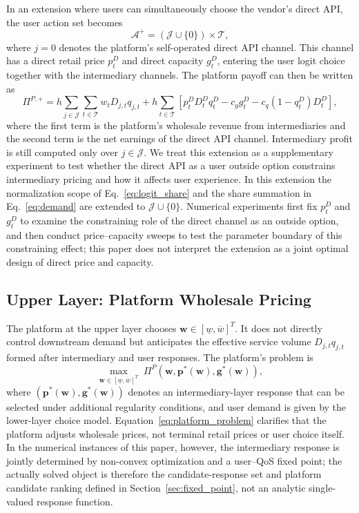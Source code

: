 \documentclass[11pt,a4paper]{article}
\newcommand{\T}{\mathcal{T}}
\newcommand{\J}{\mathcal{J}}
\newcommand{\A}{\mathcal{A}}
\newcommand{\D}{D}
\newcommand{\w}{\boldsymbol{w}}
\newcommand{\p}{\boldsymbol{p}}
\newcommand{\g}{\boldsymbol{g}}
\begin{document}
In an extension where users can simultaneously choose the vendor's direct API, the user action set becomes
\begin{equation}
  \A^+=(\J\cup\{0\})\times\T,
  \label{eq:direct_api_action_set}
\end{equation}
where $j=0$ denotes the platform's self-operated direct API channel. This channel has a direct retail price $p^D_t$ and direct capacity $g^D_t$, entering the user logit choice together with the intermediary channels. The platform payoff can then be written as
\begin{equation}
  \Pi^{P,+}
  =h\sum_{j\in\J}\sum_{t\in\T}w_t\D_{j,t}q_{j,t}
  +h\sum_{t\in\T}\left[
    p^D_t\D^D_tq^D_t-c_g g^D_t-c_q(1-q^D_t)\D^D_t
  \right],
  \label{eq:direct_platform_payoff}
\end{equation}
where the first term is the platform's wholesale revenue from intermediaries and the second term is the net earnings of the direct API channel. Intermediary profit is still computed only over $j\in\J$. We treat this extension as a supplementary experiment to test whether the direct API as a user outside option constrains intermediary pricing and how it affects user experience. In this extension the normalization scope of Eq.~\eqref{eq:logit_share} and the share summation in Eq.~\eqref{eq:demand} are extended to $\J\cup\{0\}$. Numerical experiments first fix $p^D_t$ and $g^D_t$ to examine the constraining role of the direct channel as an outside option, and then conduct price--capacity sweeps to test the parameter boundary of this constraining effect; this paper does not interpret the extension as a joint optimal design of direct price and capacity.

\subsection{Upper Layer: Platform Wholesale Pricing}
\label{sec:upper_platform}

The platform at the upper layer chooses $\w\in[\underline w,\overline w]^T$. It does not directly control downstream demand but anticipates the effective service volume $\D_{j,t}q_{j,t}$ formed after intermediary and user responses. The platform's problem is
\begin{equation}
  \max_{\w\in[\underline w,\overline w]^T}\;
  \Pi^P(\w,\p^*(\w),\g^*(\w)),
  \label{eq:platform_problem}
\end{equation}
where $(\p^*(\w),\g^*(\w))$ denotes an intermediary-layer response that can be selected under additional regularity conditions, and user demand is given by the lower-layer choice model. Equation~\eqref{eq:platform_problem} clarifies that the platform adjusts wholesale prices, not terminal retail prices or user choice itself. In the numerical instances of this paper, however, the intermediary response is jointly determined by non-convex optimization and a user--QoS fixed point; the actually solved object is therefore the candidate-response set and platform candidate ranking defined in Section~\ref{sec:fixed_point}, not an analytic single-valued response function.
\end{document}
